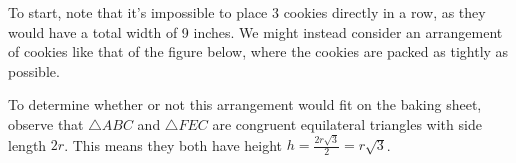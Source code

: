 \begin{solution}
    To start, note that it's impossible to place 3 cookies directly in a row, as they would have a total width of 9 inches. We might instead consider an arrangement of cookies like that of the figure below, where the cookies are packed as tightly as possible.\vspace{-\parskip}
    \pgfmathsetmacro{\m}{0.5pt}                          %
    
    
    \begin{minipage}[t]{0.69\linewidth}\vspace{0pt}\raggedright
    To determine whether or not this arrangement would fit on the baking sheet, observe that $\triangle ABC$ and $\triangle FEC$ are congruent equilateral triangles with side length $2r$. This means they both have height $h=\frac{2r\sqrt{3}}{2}=r\sqrt{3}$.\\[2pt]
    \begin{center}
\end{center}
\end{minipage}
\end{solution}
